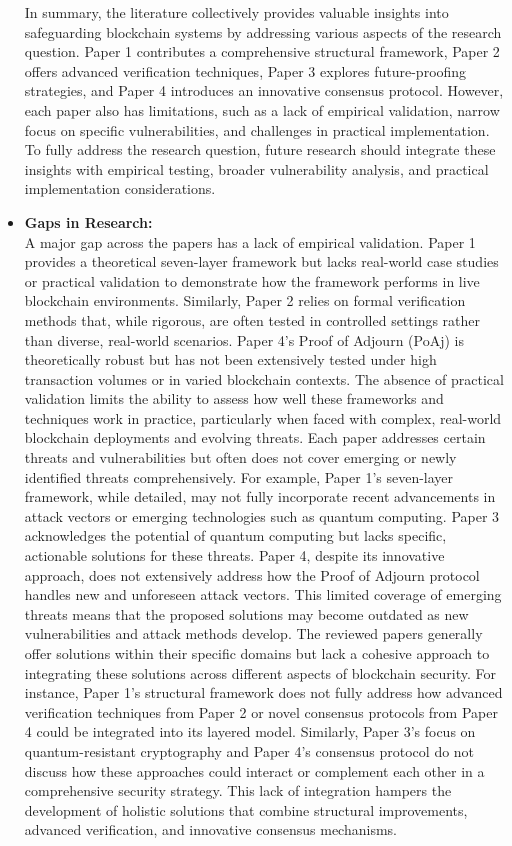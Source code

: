 \documentclass[12pt,a4paper]{article}
\begin{document}
\begin{itemize}
In summary, the literature collectively provides valuable insights into safeguarding blockchain systems by addressing various aspects of the research question. Paper 1 contributes a comprehensive structural framework, Paper 2 offers advanced verification techniques, Paper 3 explores future-proofing strategies, and Paper 4 introduces an innovative consensus protocol. However, each paper also has limitations, such as a lack of empirical validation, narrow focus on specific vulnerabilities, and challenges in practical implementation. To fully address the research question, future research should integrate these insights with empirical testing, broader vulnerability analysis, and practical implementation considerations.
    
    \item \textbf{Gaps in Research:} \\
A major gap across the papers has a lack of empirical validation. Paper 1 provides a theoretical seven-layer framework but lacks real-world case studies or practical validation to demonstrate how the framework performs in live blockchain environments. Similarly, Paper 2 relies on formal verification methods that, while rigorous, are often tested in controlled settings rather than diverse, real-world scenarios. Paper 4’s Proof of Adjourn (PoAj) is theoretically robust but has not been extensively tested under high transaction volumes or in varied blockchain contexts. The absence of practical validation limits the ability to assess how well these frameworks and techniques work in practice, particularly when faced with complex, real-world blockchain deployments and evolving threats.
Each paper addresses certain threats and vulnerabilities but often does not cover emerging or newly identified threats comprehensively. For example, Paper 1’s seven-layer framework, while detailed, may not fully incorporate recent advancements in attack vectors or emerging technologies such as quantum computing. Paper 3 acknowledges the potential of quantum computing but lacks specific, actionable solutions for these threats. Paper 4, despite its innovative approach, does not extensively address how the Proof of Adjourn protocol handles new and unforeseen attack vectors. This limited coverage of emerging threats means that the proposed solutions may become outdated as new vulnerabilities and attack methods develop.
The reviewed papers generally offer solutions within their specific domains but lack a cohesive approach to integrating these solutions across different aspects of blockchain security. For instance, Paper 1’s structural framework does not fully address how advanced verification techniques from Paper 2 or novel consensus protocols from Paper 4 could be integrated into its layered model. Similarly, Paper 3’s focus on quantum-resistant cryptography and Paper 4’s consensus protocol do not discuss how these approaches could interact or complement each other in a comprehensive security strategy. This lack of integration hampers the development of holistic solutions that combine structural improvements, advanced verification, and innovative consensus mechanisms.

\end{itemize}
\end{document}
